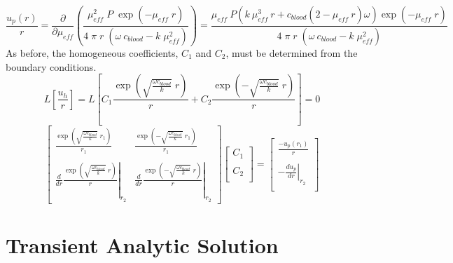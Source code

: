 \documentclass{article}         %
\theoremstyle{definition}
\theoremstyle{remark}
\begin{document}
\[
  \frac{u_p(r)}{r} = 
    \frac{\partial }{\partial \mu_\textit{eff}}
   \left(
    \frac{\mu_\textit{eff}^2 \; P \; \exp \left(-\mu_\textit{eff} \; r \right) }
         { 4 \; \pi \; r \; \left(\omega \ c_\textit{blood}-k \; \mu_\textit{eff}^2 \right)} 
   \right)
   = \frac{ \mu_\textit{eff} \ P \left(k \ \mu_\textit{eff}^3 
   \ r + c_\textit{blood} \left(2-\mu_\textit{eff} \ r \right) \omega \right) \exp \left(-\mu_\textit{eff} \;
   r \right) }{ 4 \; \pi \; r \; \left(\omega \ c_\textit{blood}-k 
   \; \mu_\textit{eff}^2 \right) }
\]
As before, the homogeneous coefficients, $C_1$ and $C_2$, must be determined from the 
boundary conditions.
\[
  L \left[\frac{u_h}{r} \right] =   
 L\left[
    C_1 \frac{\exp\left( \sqrt{\frac{\omega c_\textit{blood}}{k}} \; r \right)}{r}  
  + 
    C_2 \frac{\exp\left(-\sqrt{\frac{\omega c_\textit{blood}}{k}} \; r \right)}{r}  
\right]
  = 0
\]
\[
\begin{bmatrix}
    \frac{\exp\left( \sqrt{\frac{\omega c_\textit{blood}}{k}} \; r_1 \right)}{r_1}  
  & 
    \frac{\exp\left(-\sqrt{\frac{\omega c_\textit{blood}}{k}} \; r_1 \right)}{r_1}  
  \\
  \\
  \left.
   \frac{d}{dr}
    \frac{\exp\left( \sqrt{\frac{\omega c_\textit{blood}}{k}} \; r \right)}{r}  
  \right|_{r_2}
  & 
  \left.
   \frac{d}{dr}
    \frac{\exp\left(-\sqrt{\frac{\omega c_\textit{blood}}{k}} \; r \right)}{r}  
  \right|_{r_2}
\end{bmatrix}
\begin{bmatrix}
  C_1 \\
  \\
  C_2 \\
\end{bmatrix}
= 
\begin{bmatrix}
       \frac{- u_p(r_1)}{r}     \\
       \\
  - \left. \frac{d u_p}{dr} 
  \right|_{r_2}\\
\end{bmatrix}
\]
\section{Transient Analytic Solution}
\end{document}
